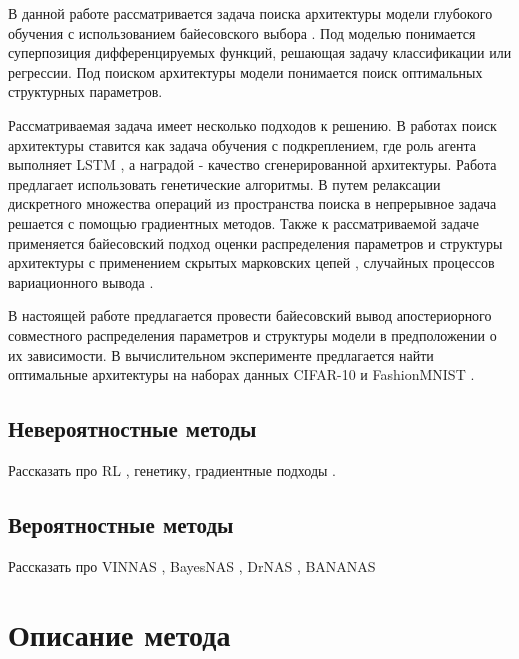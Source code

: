 \documentclass[12pt]{article}
\begin{document}
	В данной работе рассматривается задача поиска архитектуры модели глубокого обучения с использованием байесовского выбора \cite{NIPS2011_7eb3c8be}. Под моделью понимается суперпозиция дифференцируемых функций, решающая задачу классификации или регрессии. Под поиском архитектуры модели понимается поиск оптимальных структурных параметров. 
	
	Рассматриваемая задача имеет несколько подходов к решению. В работах \cite{DBLP:journals/corr/abs-1802-03268, DBLP:journals/corr/ZophL16} поиск архитектуры ставится как задача обучения с подкреплением, где роль агента выполняет LSTM \cite{article}, а наградой - качество сгенерированной архитектуры. Работа \cite{real2019regularized} предлагает использовать генетические алгоритмы. В \cite{DBLP:journals/corr/abs-1806-09055} путем релаксации дискретного множества операций из пространства поиска в непрерывное задача решается с помощью градиентных методов. Также к рассматриваемой задаче применяется байесовский подход оценки распределения параметров и структуры архитектуры с применением скрытых марковских цепей \cite{DBLP:journals/corr/abs-2007-16149}, случайных процессов \cite{inproceedings, DBLP:journals/corr/abs-2011-06006} вариационного вывода \cite{ferianc2021vinnas, zhou2019bayesnas}.
	
	В настоящей работе предлагается провести байесовский вывод апостериорного совместного распределения параметров и структуры модели в предположении о их зависимости. В вычислительном эксперименте предлагается найти оптимальные архитектуры на наборах данных CIFAR-10 \cite{cifar10} и FashionMNIST \cite{DBLP:journals/corr/abs-1708-07747}.
	
	\subsection{Невероятностные методы}
	Рассказать про RL \cite{Zoph2017}, генетику, градиентные подходы \cite{Liu2018}.
	
	\subsection{Вероятностные методы}
	Рассказать про VINNAS \cite{Ferianc2020}, BayesNAS \cite{Zhou2019}, DrNAS \cite{Chen2020}, BANANAS \cite{White2019}
	
	
	
	\newpage
	\section{Описание метода}
	
\end{document}
